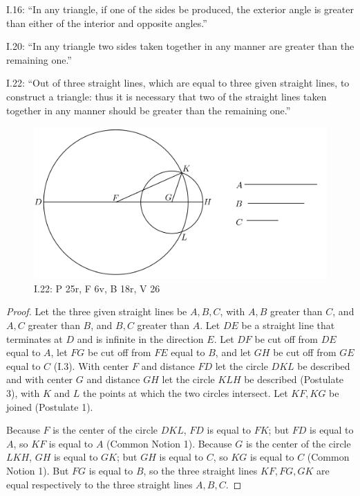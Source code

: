 \documentclass{article}
\begin{document}
I.16: ``In any triangle, if one of the sides be produced, the exterior
angle is greater than either of the interior and opposite angles.''

I.20: ``In any triangle two sides taken together in any manner
are greater than the remaining one.''

I.22: ``Out of three straight lines, which are equal to three given
straight lines, to construct a triangle: thus it is necessary that
two of the straight lines taken together in any manner should
be greater than the remaining one.''

\begin{figure}
\begin{center}
\includegraphics[width=\textwidth]{I22.png}
\end{center}
\caption{I.22: P 25r, F 6v, B 18r, V 26}
\label{I22}
\end{figure}

\begin{proof}
Let the three given straight lines be $A,B,C$, with $A,B$ greater than $C$, and $A,C$ greater than 
$B$, and $B,C$ greater than $A$. Let $DE$ be a straight line that terminates at $D$ and is infinite in the direction
$E$. Let $DF$ be cut off from $DE$ equal to $A$, let $FG$ be cut off from $FE$ equal to $B$, and let
$GH$ be cut off from $GE$ equal to $C$ (I.3).
With center $F$ and distance $FD$ let the circle $DKL$ be described and
with center $G$ and distance $GH$ let the circle $KLH$ be described (Postulate 3), with
$K$ and $L$ the points at which the two circles intersect.
Let $KF,KG$ be joined (Postulate 1).

Because $F$ is the center of the circle $DKL$, $FD$ is equal to $FK$; but $FD$ is equal to $A$, so
$KF$ is equal to $A$ (Common Notion 1).
Because $G$ is the center of the circle $LKH$, 
$GH$ is equal to $GK$; but $GH$ is equal to $C$, so
$KG$ is equal to $C$ (Common Notion 1).
But $FG$ is equal to $B$, so
the three straight lines $KF,FG,GK$ are equal respectively to the three straight lines
$A,B,C$. 
\end{proof}
\end{document}
